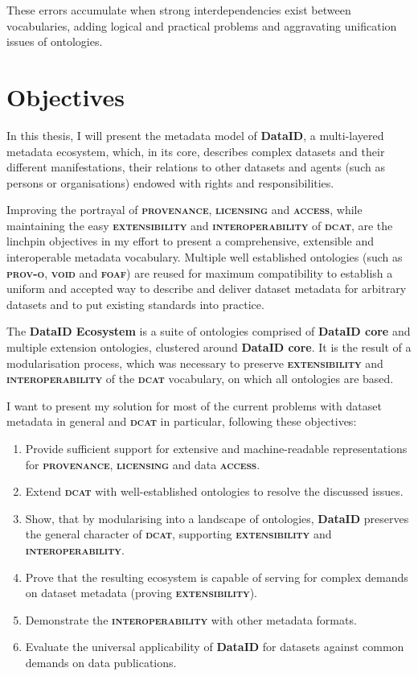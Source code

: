 \documentclass[a4paper,english,twoside,BCOR1.5cm,headsepline,DIV12,appendixprefix,final,12pt]{scrbook}
\newcommand{\provenance}{{\ttfamily\scshape\bfseries provenance}\xspace}
\newcommand{\licensing}{{\ttfamily\scshape\bfseries licensing}\xspace}
\newcommand{\access}{{\ttfamily\scshape\bfseries access}\xspace}
\newcommand{\extensibility}{{\ttfamily\scshape\bfseries extensibility}\xspace}
\newcommand{\interoperability}{{\ttfamily\scshape\bfseries interoperability}\xspace}
\newcommand{\ecosystem}{{\ttfamily\bfseries DataID Ecosystem}\xspace}
\newcommand{\dataid}{{\ttfamily\bfseries DataID}\xspace}
\newcommand{\core}{{\ttfamily\bfseries DataID core}\xspace}
\newcommand{\prov}{{\scshape\bfseries prov-o}\xspace}
\newcommand{\void}{{\scshape\bfseries void}\xspace}
\newcommand{\dcat}{{\scshape\bfseries dcat}\xspace}
\newcommand{\foaf}{{\scshape\bfseries foaf}\xspace}
\begin{document}
These errors accumulate when strong interdependencies exist between
vocabularies, adding logical and practical problems and aggravating unification issues of ontologies.

\section{Objectives}
\label{sec:objectives}
In this thesis, I will present the metadata model of \dataid, a multi-layered metadata ecosystem, which, in its core, describes complex datasets and their different manifestations, their relations to other datasets and agents (such as persons or organisations) endowed with rights and responsibilities.

Improving the portrayal of \provenance, \licensing and \access, while maintaining the easy \extensibility and \interoperability of \dcat, are the linchpin objectives in my effort to present a comprehensive, extensible and interoperable metadata vocabulary.
Multiple well established ontologies (such as \prov, \void and \foaf) are reused for maximum compatibility to establish a uniform and accepted way to describe and deliver dataset metadata for arbitrary datasets and to put existing standards into practice.

The \ecosystem is a suite of ontologies comprised of \core and multiple extension ontologies, clustered around \core. It is the result of a modularisation process, which was necessary to preserve \extensibility and \interoperability of the \dcat vocabulary, on which all ontologies are based.

I want to present my solution for most of the current problems with dataset metadata in general and \dcat in particular, following these objectives:

\begin{enumerate}
\item Provide sufficient support for extensive and machine-readable representations for \provenance, \licensing and data \access.
\item Extend \dcat with well-established ontologies to resolve the discussed issues.
\item Show, that by modularising into a landscape of ontologies, \dataid preserves the general character of \dcat, supporting \extensibility and \interoperability.
\item Prove that the resulting ecosystem is capable of serving for complex demands on dataset metadata (proving \extensibility).
\item Demonstrate the \interoperability with other metadata formats.
\item Evaluate the universal applicability of \dataid for datasets against common demands on data publications.
\end{enumerate}
\end{document}
